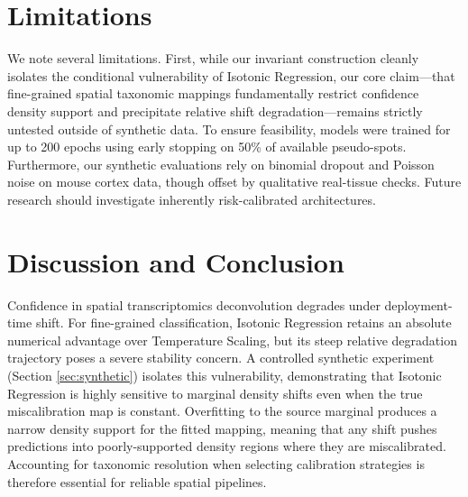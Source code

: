 \documentclass{jmlr} %
\begin{document}
\section{Limitations}
\label{sec:limitations}
We note several limitations. First, while our invariant construction cleanly isolates the conditional vulnerability of Isotonic Regression, our core claim—that fine-grained spatial taxonomic mappings fundamentally restrict confidence density support and precipitate relative shift degradation—remains strictly untested outside of synthetic data. To ensure feasibility, models were trained for up to 200 epochs using early stopping on 50\% of available pseudo-spots. Furthermore, our synthetic evaluations rely on binomial dropout and Poisson noise on mouse cortex data, though offset by qualitative real-tissue checks. Future research should investigate inherently risk-calibrated architectures.

\section{Discussion and Conclusion}
\label{sec:conclusion}
Confidence in spatial transcriptomics deconvolution degrades under deployment-time shift. For fine-grained classification, Isotonic Regression retains an absolute numerical advantage over Temperature Scaling, but its steep relative degradation trajectory poses a severe stability concern. A controlled synthetic experiment (Section \ref{sec:synthetic}) isolates this vulnerability, demonstrating that Isotonic Regression is highly sensitive to marginal density shifts even when the true miscalibration map is constant. Overfitting to the source marginal produces a narrow density support for the fitted mapping, meaning that any shift pushes predictions into poorly-supported density regions where they are miscalibrated. Accounting for taxonomic resolution when selecting calibration strategies is therefore essential for reliable spatial pipelines.



\appendix
\end{document}
